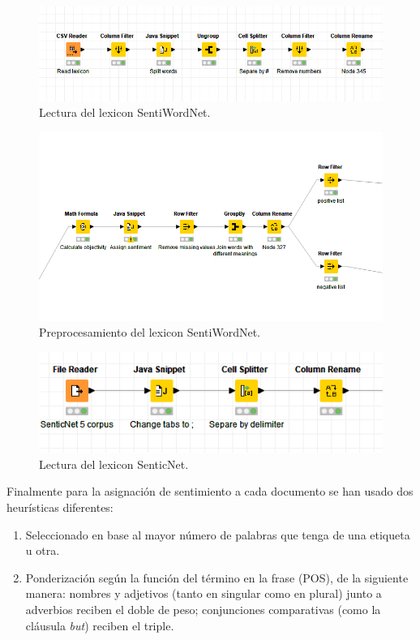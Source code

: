 \newpage

\begin{figure}[H]
    \center\includegraphics[width=.95\linewidth]{img/analysis/sentiword-reading.png}
    \caption{Lectura del lexicon SentiWordNet.}
\end{figure}

\begin{figure}[H]
    \center\includegraphics[width=.95\linewidth]{img/analysis/sentiword-prepro.png}
    \caption{Preprocesamiento del lexicon SentiWordNet.}
\end{figure}

\begin{figure}[H]
    \center\includegraphics[width=.95\linewidth]{img/analysis/senticnet-reading.png}
    \caption{Lectura del lexicon SenticNet.}
\end{figure}

\newpage

Finalmente para la asignación de sentimiento a cada documento se han usado dos heurísticas diferentes:
\begin{enumerate}
    \item Seleccionado en base al mayor número de palabras que tenga de una etiqueta u otra.
    \item Ponderización según la función del término en la frase (POS), de la siguiente manera: nombres y adjetivos (tanto en singular como en plural) junto a adverbios reciben el doble de peso; conjunciones comparativas (como la cláusula \textit{but}) reciben el triple.
\end{enumerate}


